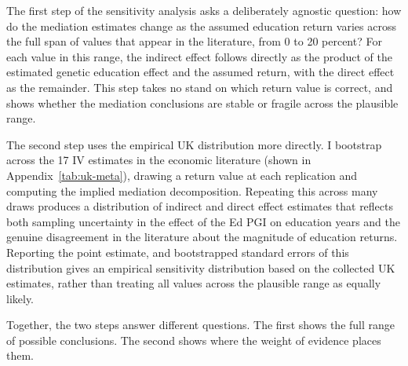 The first step of the sensitivity analysis asks a deliberately agnostic question: how do the mediation estimates change as the assumed education return varies across the full span of values that appear in the literature, from 0 to 20 percent?
For each value in this range, the indirect effect follows directly as the product of the estimated genetic education effect and the assumed return, with the direct effect as the remainder.
This step takes no stand on which return value is correct, and shows whether the mediation conclusions are stable or fragile across the plausible range.

The second step uses the empirical UK distribution more directly.
I bootstrap across the 17 IV estimates in the economic literature (shown in Appendix~\autoref{tab:uk-meta}), drawing a return value at each replication and computing the implied mediation decomposition.
Repeating this across many draws produces a distribution of indirect and direct effect estimates that reflects both sampling uncertainty in the effect of the Ed PGI on education years and the genuine disagreement in the literature about the magnitude of education returns.
Reporting the point estimate, and bootstrapped standard errors of this distribution gives an empirical sensitivity distribution based on the collected UK estimates, rather than treating all values across the plausible range as equally likely.

Together, the two steps answer different questions. The first shows the full range of possible conclusions. The second shows where the weight of evidence places them.
